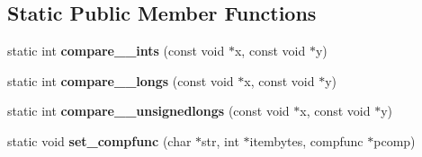 \subsection*{Static Public Member Functions}
\begin{DoxyCompactItemize}
\item 
\mbox{\label{classStemMesh3D_1_1tetgenmesh_a81320ad2fcf414d7f0c1da66efe6c938}} 
static int {\bfseries compare\+\_\+\_\+ints} (const void $\ast$x, const void $\ast$y)
\item 
\mbox{\label{classStemMesh3D_1_1tetgenmesh_a3cdbd7bb4e3cdde4f990f0eb4012bcea}} 
static int {\bfseries compare\+\_\+\_\+longs} (const void $\ast$x, const void $\ast$y)
\item 
\mbox{\label{classStemMesh3D_1_1tetgenmesh_ab5a44b5590490459207c5784c23b11af}} 
static int {\bfseries compare\+\_\+\_\+unsignedlongs} (const void $\ast$x, const void $\ast$y)
\item 
\mbox{\label{classStemMesh3D_1_1tetgenmesh_a0b057b4fdde5ab88f6ee8c905f85c12e}} 
static void {\bfseries set\+\_\+compfunc} (char $\ast$str, int $\ast$itembytes, compfunc $\ast$pcomp)
\end{DoxyCompactItemize}
